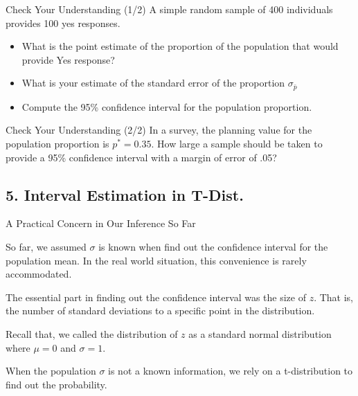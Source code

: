 \documentclass{beamer}
\begin{document}
\begin{frame}{Check Your Understanding (1/2)}
A simple random sample of 400 individuals provides 100 yes responses. 
\begin{itemize}
\item What is the point estimate of the proportion of the population that would provide Yes response?
\item What is your estimate of the standard error of the proportion $\sigma_{\bar{p}}$
\item Compute the 95\% confidence interval for the population proportion. 

\end{itemize}
\end{frame}


\begin{frame}{Check Your Understanding (2/2)}
In a survey, the planning value for the population proportion is $p^* = 0.35$. How large a sample should be taken to provide a 95\% confidence interval with a margin of error of .05?


\end{frame}



\subsection{5. Interval Estimation in T-Dist.}
\begin{frame}
\subsectionpage
\end{frame}


\begin{frame}{A Practical Concern in Our Inference So Far}

So far, we assumed $\sigma$ is known when find out the confidence interval for the population mean. In the real world situation, this convenience is rarely accommodated.

\vspace{0.3 cm}
The essential part in finding out the confidence interval was the size of $z$. That is, the number of standard deviations to a specific point in the distribution. 

\vspace{0.3 cm}
Recall that, we called the distribution of $z$ as a standard normal distribution where $\mu=0$ and $\sigma=1$. 

\vspace{0.3 cm}
When the population $\sigma$ is not a known information, we rely on a t-distribution to find out the probability. 

\end{frame}
\end{document}
